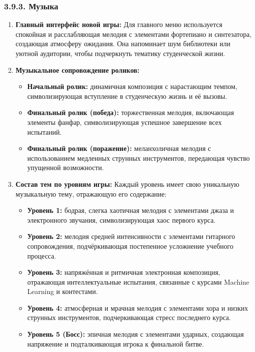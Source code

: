 \subsubsection*{3.9.3. Музыка}  

\begin{enumerate}
    \item \textbf{Главный интерфейс новой игры:}  
    Для главного меню используется спокойная и расслабляющая мелодия с элементами фортепиано и синтезатора, создающая атмосферу ожидания. Она напоминает шум библиотеки или уютной аудитории, чтобы подчеркнуть тематику студенческой жизни.  

    \item \textbf{Музыкальное сопровождение роликов:}  
    \begin{itemize}
        \item \textbf{Начальный ролик:} динамичная композиция с нарастающим темпом, символизирующая вступление в студенческую жизнь и её вызовы.  
        \item \textbf{Финальный ролик (победа):} торжественная мелодия, включающая элементы фанфар, символизирующая успешное завершение всех испытаний.  
        \item \textbf{Финальный ролик (поражение):} меланхоличная мелодия с использованием медленных струнных инструментов, передающая чувство упущенной возможности.  
    \end{itemize}

    \item \textbf{Состав тем по уровням игры:}  
    Каждый уровень имеет свою уникальную музыкальную тему, отражающую его содержание:  
    \begin{itemize}
        \item \textbf{Уровень 1:} бодрая, слегка хаотичная мелодия с элементами джаза и электронного звучания, символизирующая хаос первого курса.  
        \item \textbf{Уровень 2:} мелодия средней интенсивности с элементами гитарного сопровождения, подчёркивающая постепенное усложнение учебного процесса.  
        \item \textbf{Уровень 3:} напряжённая и ритмичная электронная композиция, отражающая интеллектуальные испытания, связанные с курсами Machine Learning и контестами.  
        \item \textbf{Уровень 4:} атмосферная и мрачная мелодия с элементами хора и низких струнных инструментов, подчеркивающая стресс последнего курса.  
        \item \textbf{Уровень 5 (Босс):} эпичная мелодия с элементами ударных, создающая напряжение и подталкивающая игрока к финальной битве.  
    \end{itemize}


\end{enumerate}
